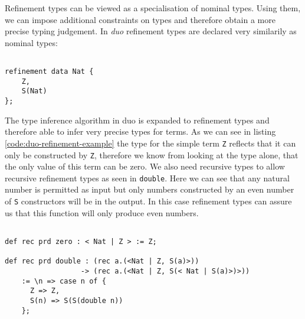 Refinement types can be viewed as a specialisation of nominal types.
Using them, we can impose additional constraints on types and therefore obtain a more precise typing judgement. \cite{springer} %
In \emph{duo} refinement types are declared very similarily as nominal types:

\begin{lstlisting}[style=duostyle, label=code:duo-refinement-declaration, captionpos=b, caption={Refinement type of peano numbers in \emph{duo}}]

refinement data Nat {
    Z,
    S(Nat)
};

\end{lstlisting}

The type inference algorithm in duo is expanded to refinement types and therefore able to infer very precise types for terms.
As we can see in listing \ref{code:duo-refinement-example} the type for the simple term \lstinline{Z} reflects that it can only be constructed by \lstinline{Z}, therefore we know from looking at the type alone, that the only value of this term can be zero.
We also need recursive types to allow recursive refinement types as seen in \lstinline{double}.
Here we can see that any natural number is permitted as input but only numbers constructed by an even number of \lstinline{S} constructors will be in the output.
In this case refinement types can assure us that this function will only produce even numbers.

\begin{lstlisting}[style=duostyle, label=code:duo-refinement-example, captionpos=b, caption={Type inference for refinement types in \emph{duo}}]

def rec prd zero : < Nat | Z > := Z;

def rec prd double : (rec a.(<Nat | Z, S(a)>))
                  -> (rec a.(<Nat | Z, S(< Nat | S(a)>)>))
    := \n => case n of {
      Z => Z,
      S(n) => S(S(double n))
    };
    
\end{lstlisting}


